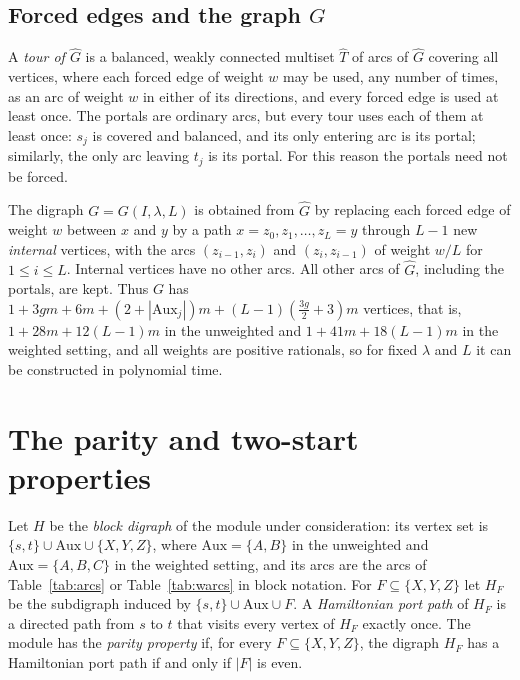 \documentclass[11pt]{amsart}
\theoremstyle{definition}
\theoremstyle{remark}
\numberwithin{equation}{section}
\newcommand{\Aux}{\mathrm{Aux}}
\newcommand{\Gh}{\widehat{G}}
\newcommand{\Th}{\widehat{T}}
\begin{document}
\subsection{Forced edges and the graph \texorpdfstring{$G$}{G}}\label{sec:forced}
A \emph{tour of $\Gh$} is a balanced, weakly connected multiset $\Th$ of arcs of $\Gh$ covering all vertices, where each forced edge of weight $w$ may be used, any number of times, as an arc of weight $w$ in either of its directions, and every forced edge is used at least once. The portals are ordinary arcs, but every tour uses each of them at least once: $s_j$ is covered and balanced, and its only entering arc is its portal; similarly, the only arc leaving $t_j$ is its portal. For this reason the portals need not be forced.

The digraph $G=G(I,\lambda,L)$ is obtained from $\Gh$ by replacing each forced edge of weight $w$ between $x$ and $y$ by a path $x=z_0,z_1,\dots,z_L=y$ through $L-1$ new \emph{internal} vertices, with the arcs $(z_{i-1},z_i)$ and $(z_i,z_{i-1})$ of weight $w/L$ for $1\le i\le L$. Internal vertices have no other arcs. All other arcs of $\Gh$, including the portals, are kept. Thus $G$ has $1+3gm+6m+(2+|\Aux_j|)m+(L-1)(\frac{3g}{2}+3)m$ vertices, that is, $1+28m+12(L-1)m$ in the unweighted and $1+41m+18(L-1)m$ in the weighted setting, and all weights are positive rationals, so for fixed $\lambda$ and $L$ it can be constructed in polynomial time.

\section{The parity and two-start properties}\label{sec:parity}

Let $H$ be the \emph{block digraph} of the module under consideration: its vertex set is $\{s,t\}\cup\Aux\cup\{X,Y,Z\}$, where $\Aux=\{A,B\}$ in the unweighted and $\Aux=\{A,B,C\}$ in the weighted setting, and its arcs are the arcs of Table~\ref{tab:arcs} or Table~\ref{tab:warcs} in block notation. For $F\subseteq\{X,Y,Z\}$ let $H_F$ be the subdigraph induced by $\{s,t\}\cup\Aux\cup F$. A \emph{Hamiltonian port path} of $H_F$ is a directed path from $s$ to $t$ that visits every vertex of $H_F$ exactly once. The module has the \emph{parity property} if, for every $F\subseteq\{X,Y,Z\}$, the digraph $H_F$ has a Hamiltonian port path if and only if $|F|$ is even.
\end{document}
